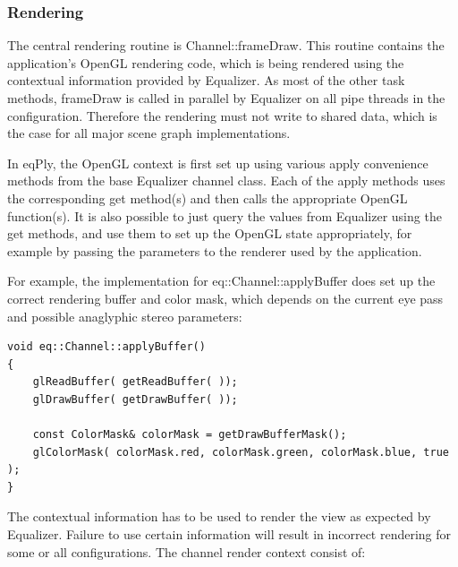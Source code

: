 \documentclass[10pt,a4]{scrartcl}
\begin{document}
\subsubsection{Rendering}

The central rendering routine is \textsf{Channel::frameDraw}. This
routine contains the application's OpenGL rendering code, which is being
rendered using the contextual information provided by Equalizer. As most
of the other task methods, \textsf{frameDraw} is called in parallel by
Equalizer on all pipe threads in the configuration. Therefore the
rendering must not write to shared data, which is the case for all major
scene graph implementations.

In \textsf{eqPly}, the OpenGL context is first set up using various
\textsf{apply} convenience methods from the base Equalizer channel
class. Each of the \textsf{apply} methods uses the corresponding
\textsf{get} method(s) and then calls the appropriate OpenGL
function(s). It is also possible to just query the values from Equalizer
using the \textsf{get} methods, and use them to set up the OpenGL state
appropriately, for example by passing the parameters to the renderer used
by the application.

For example, the implementation for \textsf{eq::Channel::applyBuffer}
does set up the correct rendering buffer and color mask, which depends
on the current eye pass and possible anaglyphic stereo parameters:

{\footnotesize\begin{lstlisting}
void eq::Channel::applyBuffer()
{
    glReadBuffer( getReadBuffer( ));
    glDrawBuffer( getDrawBuffer( ));
    
    const ColorMask& colorMask = getDrawBufferMask();
    glColorMask( colorMask.red, colorMask.green, colorMask.blue, true );
}
\end{lstlisting}}

The contextual information has to be used to render the view as
expected by Equalizer. Failure to use certain information will result in
incorrect rendering for some or all configurations. The channel render
context consist of:
\end{document}
